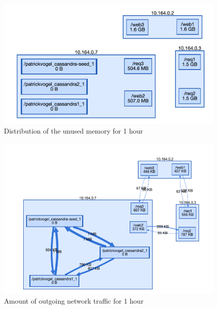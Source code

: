 \begin{figure}
    \centering
    \includegraphics[width=\textwidth]{gfx/demo_mem_waste}
    \caption{Distribution of the unused memory for 1 hour}
    \label{fig:demo_mem_waste}
\end{figure}

\begin{figure}
    \centering
    \includegraphics[width=\textwidth]{gfx/demo_network}
    \caption{Amount of outgoing network traffic for 1 hour}
    \label{fig:demo_network}
\end{figure}

